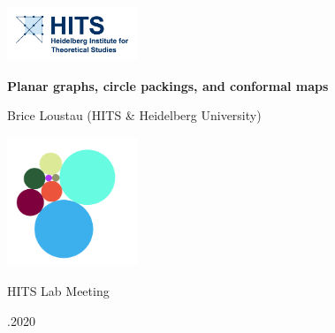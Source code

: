 \begin{frame}



\noindent \hspace{-20pt}
\includegraphics[width=110pt]{images/logo1.png}





\vspace{15pt}
\begin{center}
{\Large \bfseries Planar graphs, circle packings, and conformal maps}
  
\bigskip
{\large Brice Loustau (HITS \& Heidelberg University)}


\bigskip

\centering
\includegraphics[width=110pt]{images/CP-r.png}

\bigskip

{HITS Lab Meeting}

.2020
\end{center}
\end{frame}
